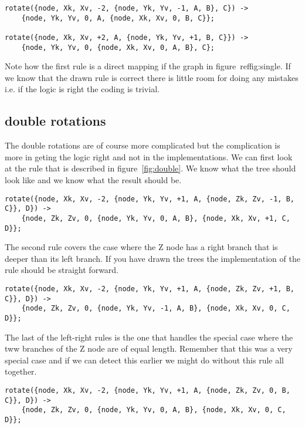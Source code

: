 \documentclass[a4paper,11pt]{article}
\begin{document}
\begin{lstlisting}
rotate({node, Xk, Xv, -2, {node, Yk, Yv, -1, A, B}, C}) ->	    
    {node, Yk, Yv, 0, A, {node, Xk, Xv, 0, B, C}};

rotate({node, Xk, Xv, +2, A, {node, Yk, Yv, +1, B, C}}) ->	    
    {node, Yk, Yv, 0, {node, Xk, Xv, 0, A, B}, C};
\end{lstlisting}

Note how the first rule is a direct mapping if the graph in
figure~ref{fig:single}. If we know that the drawn rule is correct
there is little room for doing any mistakes i.e. if the logic is right
the coding is trivial.

\subsection{double rotations}

The double rotations are of course more complicated but the
complication is more in geting the logic right and not in the
implementations. We can first look at the rule that is described in
figure~\ref{fig:double}. We know what the tree should look like and we
know what the result should be.

\begin{lstlisting}
rotate({node, Xk, Xv, -2, {node, Yk, Yv, +1, A, {node, Zk, Zv, -1, B, C}}, D}) ->	    
    {node, Zk, Zv, 0, {node, Yk, Yv, 0, A, B}, {node, Xk, Xv, +1, C, D}};
\end{lstlisting}

The second rule covers the case where the Z node has a right branch
that is deeper than its left branch. If you have drawn the trees the
implementation of the rule should be straight forward.

\begin{lstlisting}
rotate({node, Xk, Xv, -2, {node, Yk, Yv, +1, A, {node, Zk, Zv, +1, B, C}}, D}) ->	    
    {node, Zk, Zv, 0, {node, Yk, Yv, -1, A, B}, {node, Xk, Xv, 0, C, D}};
\end{lstlisting}

The last of the left-right rules is the one that handles the special
case where the tww branches of the Z node are of equal
length. Remember that this was a very special case and if we can
detect this earlier we might do without this rule all together.

\begin{lstlisting}
rotate({node, Xk, Xv, -2, {node, Yk, Yv, +1, A, {node, Zk, Zv, 0, B, C}}, D}) ->	    
    {node, Zk, Zv, 0, {node, Yk, Yv, 0, A, B}, {node, Xk, Xv, 0, C, D}};
\end{lstlisting}
\end{document}
